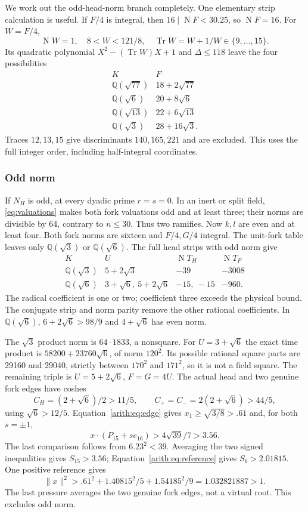 \documentclass[11pt]{article}
\theoremstyle{remark}\newtheorem{remark}[theorem]{Remark}
\numberwithin{equation}{section}
\newcommand{\Q}{\mathbb Q}
\newcommand{\Tr}{\operatorname{Tr}}
\newcommand{\N}{\operatorname{N}}
\begin{document}
We work out the odd-head-norm branch completely. One elementary strip
calculation is useful. If $F/4$ is integral, then
$16\mid\N F<30.25$, so $\N F=16$. For $W=F/4$,
\[
 \N W=1,\quad 8<W<121/8,
 \quad \Tr W=W+1/W\in\{9,\ldots,15\}.
\]
Its quadratic polynomial $X^2-(\Tr W)X+1$ and
$\Delta\le118$ leave the four possibilities
\[
\begin{array}{c|c}
K&F\\\hline
\Q(\sqrt{77})&18+2\sqrt{77}\\
\Q(\sqrt6)&20+8\sqrt6\\
\Q(\sqrt{13})&22+6\sqrt{13}\\
\Q(\sqrt3)&28+16\sqrt3.
\end{array}
\]
Traces $12,13,15$ give discriminants $140,165,221$ and are excluded.
This uses the full integer order, including half-integral coordinates.

\subsubsection{Odd norm}
If $N_H$ is odd, at every dyadic prime $r=s=0$.
In an inert or split field, \eqref{eq:valuations} makes both fork
valuations odd and at least three; their norms are divisible by
64, contrary to $n\le30$.
Thus two ramifies. Now $k,l$ are even and at least four.
Both fork norms are sixteen and $F/4,G/4$ integral.
The unit-fork table leaves only $\Q(\sqrt3)$ or $\Q(\sqrt6)$.
The full head strips with odd norm give
 \[
\begin{array}{c|l|r|r}
K&U&\N T_H&\N T_F\\\hline
\Q(\sqrt3)&5+2\sqrt3&-39&-3008\\
\Q(\sqrt6)&3+\sqrt6,\ 5+2\sqrt6&-15,\ -15&-960.
\end{array}
\]
The radical coefficient is one or two; coefficient three exceeds
the physical bound. The conjugate strip and norm parity remove
the other rational coefficients. In $\Q(\sqrt6)$,
$6+2\sqrt6>98/9$ and $4+\sqrt6$ has even norm.

The $\sqrt3$ product norm is $64\cdot1833$, a nonsquare.
For $U=3+\sqrt6$ the exact time product is
 $58200+23760\sqrt6$, of norm $120^2$.
Its possible rational square parts are 29160 and 29040,
strictly between $170^2$ and $171^2$, so it is not a field square.
The remaining triple is $U=5+2\sqrt6$, $F=G=4U$.
The actual head and two genuine fork edges have coshes
 \[
 C_H=(2+\sqrt6)/2>11/5,\qquad
 C_+=C_-=2(2+\sqrt6)>44/5,
\]
using $\sqrt6>12/5$. Equation~\eqref{arith:eq:edge} gives
 $x_1\ge\sqrt{3/8}>.61$ and, for both $s=\pm1$,
\[
 x\cdot(P_{15}+s e_{16})>4\sqrt{39}/7>3.56.
\]
The last comparison follows from $6.23^2<39$.
Averaging the two signed inequalities gives $S_{15}>3.56$;
Equation~\eqref{arith:eq:reference} gives $S_6>2.01815$.
One positive reference gives
 \[
 \|x\|^2>.61^2+1.40815^2/5+1.54185^2/9
 =1.032821887>1.
\]
The last pressure averages the two genuine fork edges, not a virtual
root. This excludes odd norm.
\end{document}
